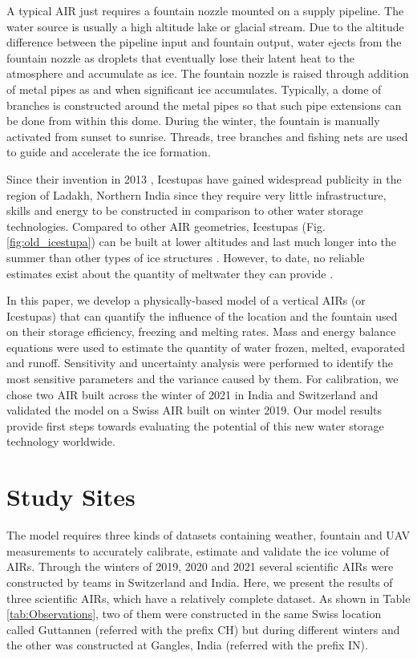 \documentclass[utf8]{frontiersSCNS} %
\begin{document}
A typical AIR just requires a fountain nozzle mounted on a supply pipeline. The water source is usually a high altitude
lake or glacial stream. Due to the altitude difference between the pipeline input and fountain output, water ejects from
the fountain nozzle as droplets that eventually lose their latent heat to the atmosphere and accumulate as ice. The
fountain nozzle is raised through addition of metal pipes as and when significant ice accumulates.  Typically, a dome of
branches is constructed around the metal pipes so that such pipe extensions can be done from within this dome. During
the winter, the fountain is manually activated from sunset to sunrise. Threads, tree branches and fishing nets are used
to guide and accelerate the ice formation.

Since their invention in 2013 \citep{campaign}, Icestupas have gained widespread publicity in the region of Ladakh,
Northern India since they require very little infrastructure, skills and energy to be constructed in comparison to other
water storage technologies. Compared to other AIR geometries, Icestupas (Fig. \ref{fig:old_icestupa}) can be built at lower
altitudes and last much longer into the summer than other types of ice structures \citep{campaign}. However, to date, no
reliable estimates exist about the quantity of meltwater they can provide \citep{Nusser_2018}.

In this paper, we develop a physically-based model of a vertical AIRs (or Icestupas) that can quantify the
influence of the location and the fountain used on their storage efficiency, freezing and melting rates. Mass and energy balance
equations were used to estimate the quantity of water frozen, melted, evaporated and runoff. Sensitivity and
uncertainty analysis were performed to identify the most sensitive parameters and the variance caused by them. For
calibration, we chose two AIR built across the winter of 2021 in India and Switzerland and validated the
model on a Swiss AIR built on winter 2019. Our model results provide first steps towards evaluating the
potential of this new water storage technology worldwide.

\section{Study Sites}
The model requires three kinds of datasets containing weather, fountain and UAV measurements to accurately calibrate,
estimate and validate the ice volume of AIRs. Through the winters of 2019, 2020 and 2021 several scientific AIRs were
constructed by teams in Switzerland and India. Here, we present the results of three scientific AIRs, which have a
relatively complete dataset. As shown in Table \ref{tab:Observations}, two of them were constructed in the same Swiss
location called Guttannen (referred with the prefix CH) but during different winters and the other was constructed at
Gangles, India (referred with the prefix IN).
\end{document}
